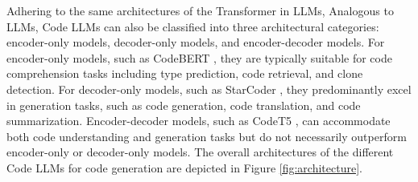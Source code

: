 Adhering to the same architectures of the Transformer \cite{vaswani2017attention} in LLMs, 
Analogous to LLMs, Code LLMs can also be classified into three architectural categories: encoder-only models, decoder-only models, and encoder-decoder models. 
For encoder-only models, such as CodeBERT \cite{feng2020codebert}, they are typically suitable for code comprehension tasks including type prediction, code retrieval, and clone detection. 
For decoder-only models, such as StarCoder \cite{brown2020language}, they predominantly excel in generation tasks, such as code generation, code translation, and code summarization. 
Encoder-decoder models, such as CodeT5 \cite{wang2021codet5}, can accommodate both code understanding and generation tasks but do not necessarily outperform encoder-only or decoder-only models. 
The overall architectures of the different Code LLMs for code generation are depicted in Figure \ref{fig:architecture}.


